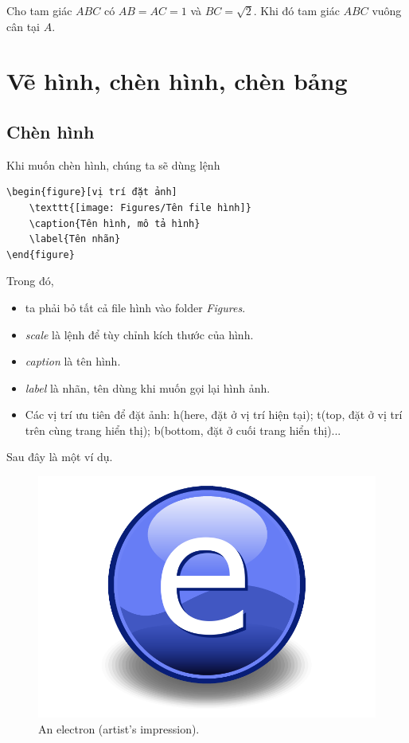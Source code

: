\begin{example}
Cho tam giác $ABC$ có $AB=AC=1$ và $BC=\sqrt{2}$. Khi đó tam giác $ABC$ vuông cân tại $A$.
\end{example}



\section{Vẽ hình, chèn hình, chèn bảng}
\subsection{Chèn hình}
Khi muốn chèn hình, chúng ta sẽ dùng lệnh
\begin{verbatim} 
\begin{figure}[vị trí đặt ảnh]
    \texttt{[image: Figures/Tên file hình]}
    \caption{Tên hình, mô tả hình}
    \label{Tên nhãn}
\end{figure}
\end{verbatim}
Trong đó,
\begin{itemize}
    \item ta phải bỏ tất cả file hình vào folder \textit{Figures}.
    \item \textit{scale} là lệnh để tùy chỉnh kích thước của hình.
    \item \textit{caption} là tên hình.
    \item \textit{label} là nhãn, tên dùng khi muốn gọi lại hình ảnh.
    \item Các vị trí ưu tiên để đặt ảnh: h(here, đặt ở vị trí hiện tại); t(top, đặt ở vị trí trên cùng trang hiển thị); b(bottom, đặt ở cuối trang hiển thị)...
\end{itemize}

Sau đây là một ví dụ.

\begin{figure}[!ht]
\centering
\includegraphics[scale=0.2]{Figures/Electron}
\caption[An Electron]{An electron (artist's impression).}
\label{fig:Electron1}
\end{figure}


